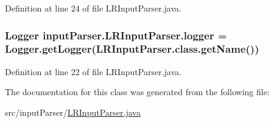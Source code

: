 Definition at line 24 of file L\-R\-Input\-Parser.\-java.

\hypertarget{classinput_parser_1_1_l_r_input_parser_ae3d6e07ebb7d4368f1a2e2ad05dae6f7}{
\subsubsection[{logger}]{\setlength{\rightskip}{0pt plus 5cm}Logger {\bf input\-Parser.\-L\-R\-Input\-Parser.\-logger} = Logger.\-get\-Logger(L\-R\-Input\-Parser.\-class.\-get\-Name())}}\label{classinput_parser_1_1_l_r_input_parser_ae3d6e07ebb7d4368f1a2e2ad05dae6f7}


Definition at line 22 of file L\-R\-Input\-Parser.\-java.



The documentation for this class was generated from the following file\-:\begin{DoxyCompactItemize}
\item 
src/input\-Parser/\hyperlink{_l_r_input_parser_8java}{L\-R\-Input\-Parser.\-java}\end{DoxyCompactItemize}
